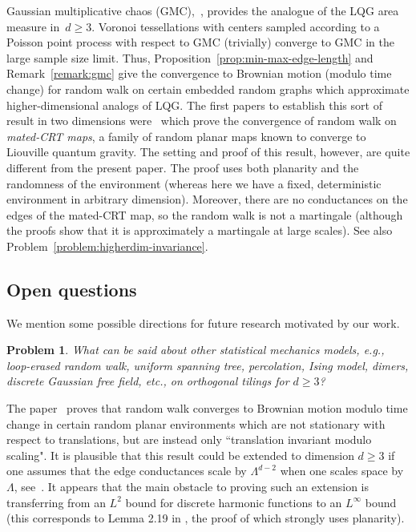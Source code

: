 \documentclass[12pt]{amsart}
\numberwithin{equation}{section}
\newcommand{\eg}{{\it e.g.}}
\newtheorem{problem}[theorem]{Problem}
\begin{document}
 Gaussian multiplicative chaos (GMC),~\cite{kahane1985chaos,rhodes2014gaussian,berestycki2024gaussian}, provides the analogue of the LQG area measure in~$d \geq 3$. Voronoi tessellations with centers sampled according to a Poisson point process with respect to GMC (trivially) converge to GMC in the large sample size limit. Thus, Proposition~\ref{prop:min-max-edge-length} and Remark~\ref{remark:gmc} give the convergence to Brownian motion (modulo time change) for random walk on certain embedded random graphs which approximate higher-dimensional analogs of LQG. The first papers to establish this sort of result in two dimensions were~\cite{ GMS-Tutte, GMSInvariance} which prove the convergence of random walk on \emph{mated-CRT maps}, a family of random planar maps known to converge to Liouville quantum gravity. The setting and proof of this result, however, are quite different from the present paper. The proof uses both planarity and the randomness of the environment (whereas here we have a fixed, deterministic environment in arbitrary dimension). Moreover, there are no conductances on the edges of the mated-CRT map, so the random walk is not a martingale (although the proofs show that it is approximately a martingale at large scales). See also Problem~\ref{problem:higherdim-invariance}.







\subsection{Open questions}
We mention some possible directions for future research motivated by our work. 
\begin{problem} \label{problem:lerw}
	What can be said about other statistical mechanics models, \eg, loop-erased random walk, uniform spanning tree, percolation, Ising model, dimers, discrete Gaussian free field, etc., on orthogonal tilings for $d\geq 3$?
\end{problem}


The paper~\cite{GMSInvariance} proves that random walk converges to Brownian motion modulo time change in certain random planar environments which are not stationary with respect to translations, but are instead only ``translation invariant modulo scaling". It is plausible that this result could be extended to dimension $d\geq 3$ if one assumes that the edge conductances scale by $\Lambda^{d-2}$ when one scales space by $\Lambda$, see~\cite[Section 1.5]{GMSInvariance}. It appears that the main obstacle to proving such an extension is transferring from an $L^2$ bound for discrete harmonic functions to an $L^\infty$ bound (this corresponds to Lemma 2.19 in \cite{GMSInvariance}, the proof of which strongly uses planarity).
\end{document}
